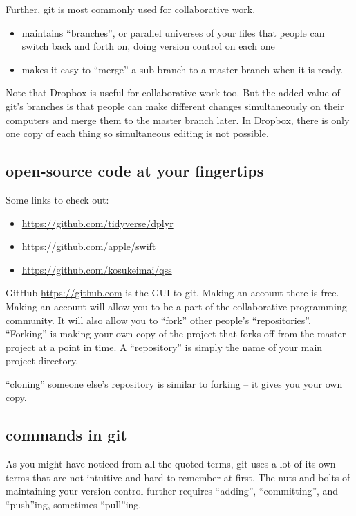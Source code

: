 \documentclass[]{book}
\providecommand{\tightlist}{%
  \setlength{\itemsep}{0pt}\setlength{\parskip}{0pt}}
\theoremstyle{definition}
\theoremstyle{definition}
\theoremstyle{definition}
\theoremstyle{remark}
\begin{document}
Further, git is most commonly used for collaborative work.

\begin{itemize}
\tightlist
\item
  maintains ``branches'', or parallel universes of your files that
  people can switch back and forth on, doing version control on each one
\item
  makes it easy to ``merge'' a sub-branch to a master branch when it is
  ready.
\end{itemize}

Note that Dropbox is useful for collaborative work too. But the added
value of git's branches is that people can make different changes
simultaneously on their computers and merge them to the master branch
later. In Dropbox, there is only one copy of each thing so simultaneous
editing is not possible.

\subsection{open-source code at your
fingertips}\label{open-source-code-at-your-fingertips}

Some links to check out:

\begin{itemize}
\tightlist
\item
  \url{https://github.com/tidyverse/dplyr}
\item
  \url{https://github.com/apple/swift}
\item
  \url{https://github.com/kosukeimai/qss}
\end{itemize}

GitHub \url{https://github.com} is the GUI to git. Making an account
there is free. Making an account will allow you to be a part of the
collaborative programming community. It will also allow you to ``fork''
other people's ``repositories''. ``Forking'' is making your own copy of
the project that forks off from the master project at a point in time. A
``repository'' is simply the name of your main project directory.

``cloning'' someone else's repository is similar to forking -- it gives
you your own copy.

\subsection{commands in git}\label{commands-in-git}

As you might have noticed from all the quoted terms, git uses a lot of
its own terms that are not intuitive and hard to remember at first. The
nuts and bolts of maintaining your version control further requires
``adding'', ``committing'', and ``push''ing, sometimes ``pull''ing.
\end{document}
